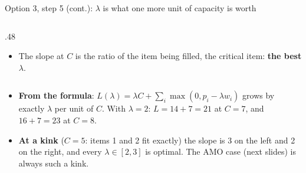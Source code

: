\documentclass[aspectratio=169,11pt]{beamer}
\begin{document}
\begin{frame}{Option 3, step 5 (cont.): $\lambda$ is what one more unit of capacity is worth}
\begin{columns}[T]
\begin{column}{.48\textwidth}
\begin{itemize}
\item The slope at $C$ is the ratio of the item being filled, the critical item: \textbf{the best $\lambda$}.
\end{itemize}
\end{column}
\end{columns}
\vspace{1mm}
\begin{itemize}\setlength\itemsep{1pt}
\item \textbf{From the formula}: $L(\lambda) = \lambda C + \sum_i \max(0, p_i - \lambda w_i)$ grows by exactly $\lambda$ per unit
  of $C$. With $\lambda = 2$: $L = 14 + 7 = 21$ at $C = 7$, and $16 + 7 = 23$ at $C = 8$.
\item \textbf{At a kink} ($C = 5$: items 1 and 2 fit exactly) the slope is 3 on the left and 2 on the right, and every
  $\lambda \in [2, 3]$ is optimal. The AMO case (next slides) is always such a kink.
\end{itemize}
\end{frame}
\end{document}
